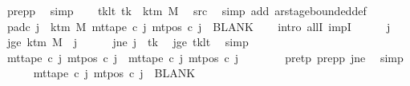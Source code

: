 \begin{isabellebody}
\ pre{\isacharunderscore}{\kern0pt}pp\ \isamarkupfalse%
\ simp\isanewline
\ \ \isamarkupfalse%
\ tk{\isacharunderscore}{\kern0pt}lt{\isacharcolon}{\kern0pt}\ {\isachardoublequoteopen}tk\ {\isacharless}{\kern0pt}\ k{\isacharunderscore}{\kern0pt}tm\ M{\isachardoublequoteclose}\ \isamarkupfalse%
\ src{}\ \isamarkupfalse%
\ {\isacharparenleft}{\kern0pt}simp\ add{\isacharcolon}{\kern0pt}\ ar{\isacharunderscore}{\kern0pt}stage{\isacharunderscore}{\kern0pt}bounded{\isacharunderscore}{\kern0pt}def{\isacharparenright}{\kern0pt}\isanewline
\ \ \isamarkupfalse%
\ pad{\isacharunderscore}{\kern0pt}c{}{\isacharcolon}{\kern0pt}\ {\isachardoublequoteopen}{\isasymforall}j\ {\isasymge}\ k{\isacharunderscore}{\kern0pt}tm\ M{\isachardot}{\kern0pt}\ mt{\isacharunderscore}{\kern0pt}tape\ c{}\ j\ {\isacharparenleft}{\kern0pt}mt{\isacharunderscore}{\kern0pt}pos\ c{}\ j{\isacharparenright}{\kern0pt}\ {\isacharequal}{\kern0pt}\ BLANK{}{\isachardoublequoteclose}\isanewline
\ \ \isamarkupfalse%
\ {\isacharparenleft}{\kern0pt}intro\ allI\ impI{\isacharparenright}{\kern0pt}\isanewline
\ \ \ \ \isamarkupfalse%
\ j\ \isamarkupfalse%
\ jge{\isacharcolon}{\kern0pt}\ {\isachardoublequoteopen}k{\isacharunderscore}{\kern0pt}tm\ M\ {\isasymle}\ j{\isachardoublequoteclose}\isanewline
\ \ \ \ \isamarkupfalse%
\ jne{\isacharcolon}{\kern0pt}\ {\isachardoublequoteopen}j\ {\isasymnoteq}\ tk{\isachardoublequoteclose}\ \isamarkupfalse%
\ jge\ tk{\isacharunderscore}{\kern0pt}lt\ \isamarkupfalse%
\ simp\isanewline
\ \ \ \ \isamarkupfalse%
\ {\isachardoublequoteopen}mt{\isacharunderscore}{\kern0pt}tape\ c{}\ j\ {\isacharparenleft}{\kern0pt}mt{\isacharunderscore}{\kern0pt}pos\ c{}\ j{\isacharparenright}{\kern0pt}\ {\isacharequal}{\kern0pt}\ mt{\isacharunderscore}{\kern0pt}tape\ c{\isacharprime}{\kern0pt}\ j\ {\isacharparenleft}{\kern0pt}mt{\isacharunderscore}{\kern0pt}pos\ c{\isacharprime}{\kern0pt}\ j{\isacharparenright}{\kern0pt}{\isachardoublequoteclose}\isanewline
\ \ \ \ \ \ \isamarkupfalse%
\ pre{\isacharunderscore}{\kern0pt}tp\ pre{\isacharunderscore}{\kern0pt}pp\ jne\ \isamarkupfalse%
\ simp\isanewline
\ \ \ \ \isamarkupfalse%
\ {\isachardoublequoteopen}mt{\isacharunderscore}{\kern0pt}tape\ c{}\ j\ {\isacharparenleft}{\kern0pt}mt{\isacharunderscore}{\kern0pt}pos\ c{}\ j{\isacharparenright}{\kern0pt}\ {\isacharequal}{\kern0pt}\ BLANK{}{\isachardoublequoteclose}\ \isamarkupfalse%

\end{isabellebody}

